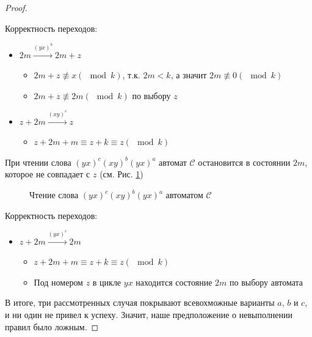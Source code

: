 \documentclass{article}
\begin{document}
\begin{proof}
\begin{enumerate}
			Корректность переходов:
			\begin{itemize}
				\item $2m \xrightarrow{(yx)^b} 2m+z$
				\begin{itemize}
					\item $2m+z \not \equiv x (\mod k)$, т.к. $2m < k$, а значит $2m \not \equiv 0 (\mod k)$
					\item $2m+z \not \equiv 2m (\mod k)$ по выбору $z$\\
				\end{itemize}
			
				\item $z+2m \xrightarrow{(xy)^c} z$
				\begin{itemize}
					\item $z+2m+m \equiv z+k \equiv z (\mod k)$
				\end{itemize}
			\end{itemize}
		
			При чтении слова $(yx)^c(xy)^b(yx)^a$ автомат $\mathscr{C}$ остановится в состоянии $2m$, которое не совпадает с $z$ (см. Рис. \ref{process2_2m_z})
			
			\begin{figure}
				\caption{Чтение слова $(yx)^c(xy)^b(yx)^a$ автоматом $\mathscr{C}$}
				\label{process2_2m_z}
			\end{figure}
		
			Корректность переходов:
			\begin{itemize}
				\item $z+2m \xrightarrow{(yx)^c} 2m$
				\begin{itemize}
					\item $z+2m+m \equiv z+k \equiv z (\mod k)$
					\item Под номером $z$ в цикле $yx$ находится состояние $2m$ по выбору автомата
				\end{itemize}
			\end{itemize}
		\end{enumerate}
	
		В итоге, три рассмотренных случая покрывают всевохможные варианты $a$, $b$ и $c$, и ни один не привел к успеху. Значит, наше предположение о невыполнении правил было ложным.
	\end{proof}
\end{document}
